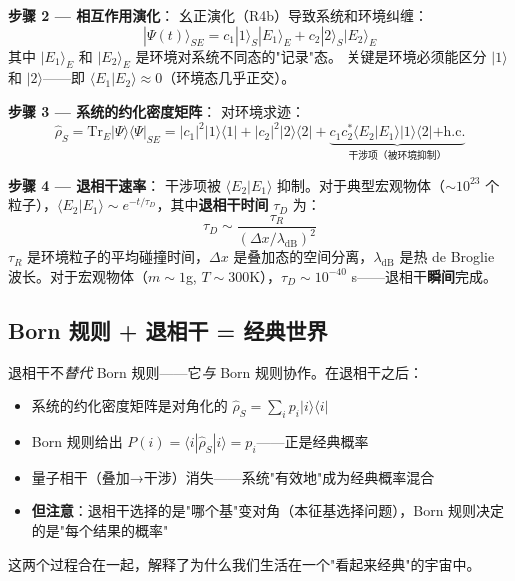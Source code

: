\textbf{步骤 2 — 相互作用演化}：\fbox{[S]} 幺正演化（R4b）导致系统和环境纠缠：
\begin{equation}
|\Psi(t)\rangle_{SE} = c_1|1\rangle_S|E_1\rangle_E + c_2|2\rangle_S|E_2\rangle_E
\end{equation}
其中 $|E_1\rangle_E$ 和 $|E_2\rangle_E$ 是环境对系统不同态的"记录"态。\fbox{[N]} 关键是环境必须能区分 $|1\rangle$ 和 $|2\rangle$——即 $\langle E_1|E_2\rangle \approx 0$（环境态几乎正交）。

\textbf{步骤 3 — 系统的约化密度矩阵}：\fbox{[S]} 对环境求迹：
\begin{equation}
\hat{\rho}_S = \text{Tr}_E|\Psi\rangle\langle\Psi|_{SE}
= |c_1|^2|1\rangle\langle 1| + |c_2|^2|2\rangle\langle 2| + \underbrace{c_1c_2^*\langle E_2|E_1\rangle|1\rangle\langle 2| + \text{h.c.}}_{\text{干涉项（被环境抑制）}}
\end{equation}

\textbf{步骤 4 — 退相干速率}：\fbox{[S]} 干涉项被 $\langle E_2|E_1\rangle$ 抑制。对于典型宏观物体（$\sim 10^{23}$ 个粒子），$\langle E_2|E_1\rangle \sim e^{-t/\tau_D}$，其中\textbf{退相干时间} $\tau_D$ 为：
\begin{equation}
\tau_D \sim \frac{\tau_R}{(\Delta x/\lambda_{\text{dB}})^2}
\end{equation}
$\tau_R$ 是环境粒子的平均碰撞时间，$\Delta x$ 是叠加态的空间分离，$\lambda_{\text{dB}}$ 是热 de Broglie 波长。对于宏观物体（$m \sim 1$g, $T \sim 300$K），$\tau_D \sim 10^{-40}$ s——退相干\textbf{瞬间}完成。


\subsection{Born 规则 + 退相干 = 经典世界}

\begin{insightbox}[量子→经典的桥梁]
  退相干不\emph{替代} Born 规则——它\emph{与} Born 规则协作。在退相干之后：
  \begin{itemize}
    \item 系统的约化密度矩阵是对角化的 $\hat{\rho}_S = \sum_i p_i|i\rangle\langle i|$
    \item Born 规则给出 $P(i) = \langle i|\hat{\rho}_S|i\rangle = p_i$——正是经典概率
    \item 量子相干（叠加→干涉）消失——系统"有效地"成为经典概率混合
    \item \textbf{但注意}：退相干选择的是"哪个基"变对角（本征基选择问题），Born 规则决定的是"每个结果的概率"
  \end{itemize}
  这两个过程合在一起，解释了为什么我们生活在一个"看起来经典"的宇宙中。
\end{insightbox}

